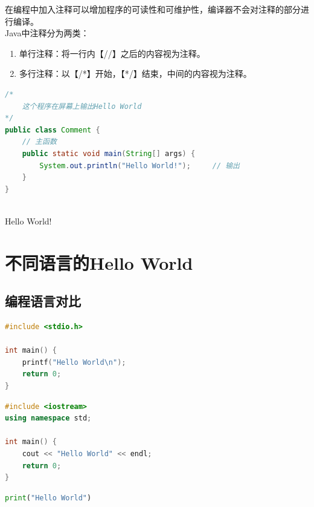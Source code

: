 在编程中加入注释可以增加程序的可读性和可维护性，编译器不会对注释的部分进行编译。 \\

Java中注释分为两类：

\begin{enumerate}
	\item 单行注释：将一行内【//】之后的内容视为注释。
	\item 多行注释：以【/*】开始，【*/】结束，中间的内容视为注释。
\end{enumerate}

\begin{lstlisting}[language=Java]
/*
	这个程序在屏幕上输出Hello World
*/
public class Comment {
	// 主函数
	public static void main(String[] args) {
		System.out.println("Hello World!");		// 输出
	}
}
\end{lstlisting}

\begin{tcolorbox}
	 \\
	Hello World!
\end{tcolorbox}

\newpage

\section{不同语言的Hello World}

\subsection{编程语言对比}

\begin{lstlisting}[language=C]
#include <stdio.h>

int main() {
	printf("Hello World\n");
	return 0;
}
\end{lstlisting}

\vspace{0.5cm}
\begin{lstlisting}[language=C++]
#include <iostream>
using namespace std;

int main() {
	cout << "Hello World" << endl;
	return 0;
}
\end{lstlisting}

\vspace{0.5cm}
\begin{lstlisting}[language=Python]
print("Hello World")
\end{lstlisting}

\newpage